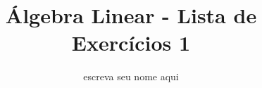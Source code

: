 \documentclass[leqno]{article}
\numberwithin{equation}{section}
\begin{document}
\newtheorem{teo}{Teorema}[section] \newtheorem*{teo*}{Teorema}
\newtheorem{prop}[teo]{Proposição} \newtheorem*{prop*}{Proposição}
\newtheorem{lema}[teo]{Lemma} \newtheorem*{lema*}{Lema}
\newtheorem{cor}[teo]{Corolário} \newtheorem*{cor*}{Corolário}

\theoremstyle{definition}
\newtheorem{defi}[teo]{Definição} \newtheorem*{defi*}{Definição}
\newtheorem{exem}[teo]{Exemplo} \newtheorem*{exem*}{Exemplo}
\newtheorem{obs}[teo]{Observação} \newtheorem*{obs*}{Observação}
\newtheorem*{hipo}{Hipóteses}
\newtheorem*{nota}{Notação}

\newcommand{\ds}{\displaystyle} \newcommand{\nl}{\newline}
\newcommand{\eps}{\varepsilon} \newcommand{\ssty}{\scriptstyle}
\newcommand{\bE}{\mathbb{E}}
\newcommand{\cB}{\mathcal{B}}
\newcommand{\cF}{\mathcal{F}}
\newcommand{\cA}{\mathcal{A}}
\newcommand{\cM}{\mathcal{M}}
\newcommand{\cD}{\mathcal{D}}
\newcommand{\cN}{\mathcal{N}}
\newcommand{\cL}{\mathcal{L}}
\newcommand{\cLN}{\mathcal{LN}}
\newcommand{\bP}{\mathbb{P}}
\newcommand{\bQ}{\mathbb{Q}}
\newcommand{\bN}{\mathbb{N}}
\newcommand{\bR}{\mathbb{R}}
\newcommand{\bZ}{\mathbb{Z}}

\newcommand{\bfw}{\mathbf{w}}
\newcommand{\bfv}{\mathbf{v}}
\newcommand{\bfu}{\mathbf{u}}
\newcommand{\bfb}{\mathbf{b}}
\newcommand{\bfx}{\mathbf{x}}
\newcommand{\bfa}{\mathbf{a}}

\newcommand{\bvecc}[2]{%
  \begin{bmatrix} #1 \\ #2  \end{bmatrix}
}
\newcommand{\bveccc}[3]{%
  \begin{bmatrix} #1 \\ #2 \\ #3  \end{bmatrix}
}


\title{Álgebra Linear - Lista de Exercícios 1}

\author{escreva seu nome aqui}

\date{}

\maketitle
\end{document}
